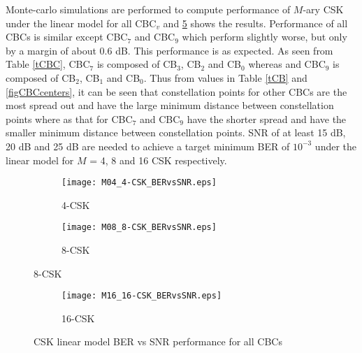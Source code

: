 Monte-carlo simulations are performed to compute performance of $M$-ary CSK under the linear model for all CBC$_{v}$ and \figurename{ }\ref{figBERvsSNR} shows the results. Performance of all CBCs is similar except CBC$_{7}$ and CBC$_{9}$ which perform slightly worse, but only by a margin of about 0.6 dB. This performance is as expected. As seen from Table \ref{tCBC}, CBC$_{7}$ is composed of CB$_{3}$, CB$_{2}$ and CB$_{0}$ whereas and CBC$_{9}$ is composed of CB$_{2}$, CB$_{1}$ and CB$_{0}$. Thus from values in Table \ref{tCB} and \figurename{ }\ref{figCBCcenters}, it can be seen that constellation points for other CBCs are the most spread out and have the large minimum distance between constellation points where as that for CBC$_{7}$ and CBC$_{9}$ have the shorter spread and have the smaller minimum distance between constellation points. SNR of at least 15 dB, 20 dB and 25 dB are needed to achieve a target minimum BER of $10^{-3}$ under the linear model for $M$ = 4, 8 and 16 CSK respectively.
\begin{figure}[H]
	\centering
		\begin{subfigure}{\textwidth}
		\centering
			\texttt{[image: M04\_4-CSK\_BERvsSNR.eps]}
			\caption{4-CSK}
			\label{fig4SNR}
		\end{subfigure}
		\begin{subfigure}{\textwidth}
		\centering
			\texttt{[image: M08\_8-CSK\_BERvsSNR.eps]}
			\caption{8-CSK}
			\label{fig8SNR}
		\end{subfigure}
\end{figure}
\begin{figure}[H]
	\ContinuedFloat
		\begin{subfigure}{\textwidth}
		\centering
			\texttt{[image: M16\_16-CSK\_BERvsSNR.eps]}
			\caption{16-CSK}
			\label{fig16SNR}
		\end{subfigure}
	\caption{CSK linear model BER vs SNR performance for all CBCs}
	\label{figBERvsSNR}
\end{figure}

